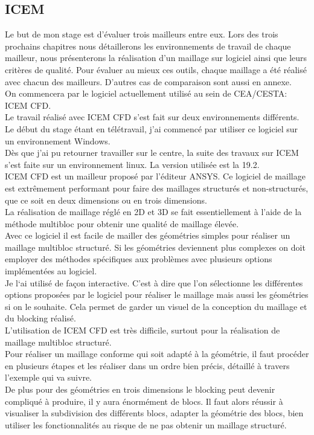 \subsection{ICEM}

Le but de mon stage est d'évaluer trois mailleurs entre eux. Lors des trois prochains chapitres nous détaillerons les environnements de travail de chaque mailleur, nous présenterons la réalisation d'un maillage sur logiciel ainsi que leurs critères de qualité. Pour évaluer au mieux ces outils, chaque maillage a été réalisé avec chacun des mailleurs. D’autres cas de comparaison sont aussi en annexe.\\
On commencera par le logiciel actuellement utilisé au sein de CEA/CESTA: ICEM CFD.\\

Le travail réalisé avec ICEM CFD s'est fait sur deux environnements différents. Le début du stage étant en télétravail, j'ai commencé par utiliser ce logiciel sur un environnement Windows.\\
Dès que j'ai pu retourner travailler sur le centre, la suite des travaux sur ICEM s'est faite sur un environnement linux. La version utilisée est la 19.2.\\

ICEM CFD est un mailleur proposé par l'éditeur ANSYS. Ce logiciel de maillage est extrêmement performant pour faire des maillages structurés et non-structurés, que ce soit en deux dimensions ou en trois dimensions.\\
La réalisation de maillage réglé en 2D et 3D se fait essentiellement à l'aide de la méthode multibloc pour obtenir une qualité de maillage élevée.\\
Avec ce logiciel il est facile de mailler des géométries simples pour réaliser un maillage multibloc structuré. Si les géométries deviennent plus complexes on doit employer des méthodes spécifiques aux problèmes avec plusieurs options implémentées au logiciel.\\

Je l‘ai utilisé de façon interactive. C'est à dire que l’on sélectionne les différentes options proposées par le logiciel pour réaliser le maillage mais aussi les géométries si on le souhaite. Cela permet de garder un visuel de la conception du maillage et du blocking réalisé.\\

L'utilisation de ICEM CFD est très difficile, surtout pour la réalisation de maillage multibloc structuré.\\
Pour réaliser un maillage conforme qui soit adapté à la géométrie, il faut procéder en plusieurs étapes et les réaliser dans un ordre bien précis, détaillé à travers l'exemple qui va suivre.\\
De plus pour des géométries en trois dimensions le blocking peut devenir compliqué à produire, il y aura énormément de blocs. Il faut alors réussir à visualiser la subdivision des différents blocs, adapter la géométrie des blocs, bien utiliser les fonctionnalités au risque de ne pas obtenir un maillage structuré.


